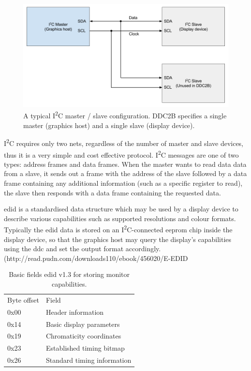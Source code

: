 \begin{figure}
  \centering
  \includegraphics[width=1\textwidth]{./img/i2c_bus.png}
  \caption{A typical I\textsuperscript{2}C master / slave configuration. DDC2B specifies a single master (graphics host) and a single slave (display device).}
  \label{fig:i2c_bus}
\end{figure}

I\textsuperscript{2}C requires only two nets, regardless of the number of master and slave devices, thus it is a very simple and cost effective protocol. I\textsuperscript{2}C messages are one of two types: address frames and data frames. When the master wants to read data data from a slave, it sends out a frame with the address of the slave followed by a data frame containing any additional information (such as a specific register to read), the slave then responds with a data frame containing the requested data.

\gls{edid} is a standardised data structure which may be used by a display device to describe various capabilities such as supported resolutions and colour formats. Typically the \gls{edid} data is stored on an I\textsuperscript{2}C-connected \gls{eeprom} chip inside the display device, so that the graphics host may query the display's capabilities using the \gls{ddc} and set the output format accordingly. (http://read.pudn.com/downloads110/ebook/456020/E-EDID%

\begin{table}
    \begin{tabular}{ll}
    Byte offset & Field                       \\
    0x00        & Header information          \\
    0x14        & Basic display parameters    \\
    0x19        & Chromaticity coordinates    \\
    0x23        & Established timing bitmap   \\
    0x26        & Standard timing information \\
    \end{tabular}
    \caption{Basic fields \gls{edid} v1.3 for storing monitor capabilities.}
    \label{table:basic_edid_fields}
\end{table}


